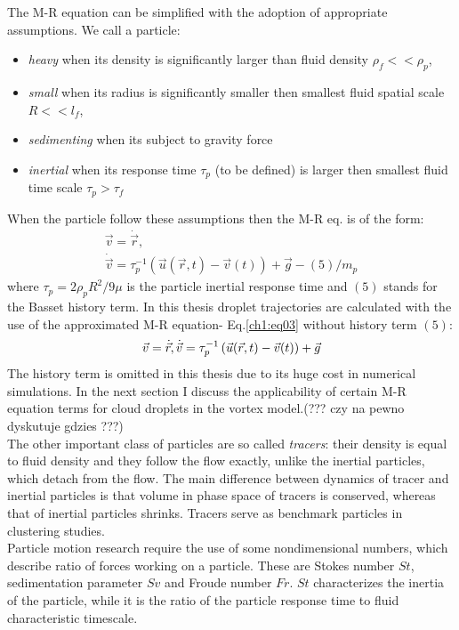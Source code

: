 \documentclass[../main.tex]{subfiles}
\begin{document}
The M-R equation can be simplified with the adoption of appropriate assumptions. We call a particle:
\begin{itemize}
\item \emph{heavy} when its density is significantly larger than fluid density $\rho_f<<\rho_p$,
\item \emph{small} when its radius is significantly smaller then smallest fluid spatial scale $R<<l_f$,
\item \emph{sedimenting} when its subject to gravity force
\item \emph{inertial} when its response time $\tau_p$ (to be defined) is larger then smallest fluid time scale $\tau_p>\tau_f$
\end{itemize}
When the particle follow these assumptions then the M-R eq. is of the form:
\begin{align}
\vec{v}=\dot{\vec{r}},\\
\dot{\vec{v}}=\tau_p^{-1}\left(\vec{u}(\vec{r},t) -\vec{v}(t)\right)+\vec{g}-(5)/m_p
\label{ch1:eq03}
\end{align}
where $\tau_p=2 \rho_p R^2/9\mu$ is the particle inertial response time and $(5)$ stands for the Basset history term. In this thesis droplet trajectories are calculated with the use of the approximated M-R equation- Eq.\ref{ch1:eq03} without history term $(5)$:
\begin{equation}
\vec{v}=\dot{\vec{r}},\\
\dot{\vec{v}}=\tau_p^{-1}\left(\vec{u}(\vec{r},t) -\vec{v}(t)\right)+\vec{g}
\label{ch1:eq04}
\end{equation}
The history term is omitted in this thesis due to its huge cost in numerical simulations. In the next section I discuss the applicability of certain M-R equation terms for cloud droplets in the vortex model.(??? czy na pewno dyskutuje gdzies ???)\\ 
The other important class of particles are so called \emph{tracers}: their density is equal to fluid density and they follow the flow exactly, unlike the inertial particles, which detach from the flow. The main difference between dynamics of tracer and inertial particles is that volume in phase space of tracers is conserved, whereas that of inertial particles shrinks. Tracers serve as benchmark particles in clustering studies.\\
Particle motion research require the use of some nondimensional numbers, which describe ratio of forces working on a particle. These are Stokes number $St$, sedimentation parameter $Sv$ and Froude number $Fr$. $St$ characterizes the inertia of the particle, while it is the ratio of the particle response time to fluid characteristic timescale. 
\end{document}
